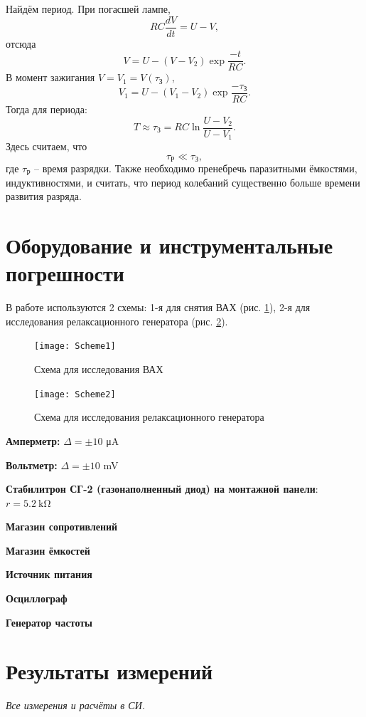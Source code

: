 \documentclass[a4paper]{article}
\newcommand{\picref}[1]{рис. \ref{#1}}
\newcommand{\Equip}[3]{
	
	{\bf #1:} $\Delta = \pm #2$ \si{#3}}
\newcommand{\equip}[1]{
	
	{\bf #1}}
\begin{document}
Найдём период. При погасшей лампе,
\begin{equation*}\label{key}
	R C \frac{d V}{d t} = U - V,
\end{equation*}
отсюда
\begin{equation*}\label{key}
	V = U - (V - V_2)\exp \frac{-t}{R C}.
\end{equation*}
В момент зажигания $ V = V_1 = V(\tau_З) $,
\begin{equation*}\label{key}
	V_1 = U - (V_1 - V_2)\exp \frac{-\tau_З}{R C}.
\end{equation*}
Тогда для периода:
\begin{equation}\label{y}
	T \approx \tau_З = R C \ln \frac{U-V_2}{U-V_1}.
\end{equation}
Здесь считаем, что 
\begin{equation}\label{усл}
	 \tau_Р \ll \tau_З,
\end{equation}
где $ \tau_Р $ -- время разрядки. Также необходимо пренебречь паразитными ёмкостями, индуктивностями, и считать, что период колебаний существенно больше времени развития разряда.


\section{Оборудование и инструментальные погрешности}

В работе используются 2 схемы: 1-я для снятия ВАХ (\picref{fig:s1}), 2-я для исследования релаксационного генератора (\picref{fig:s2}).

\begin{figure}[tbp]
	\centering
	\texttt{[image: Scheme1]}
	\caption{Схема для исследования ВАХ}
	\label{fig:s1}
\end{figure}

\begin{figure}[tbp]
	\centering
	\texttt{[image: Scheme2]}
	\caption{Схема для исследования релаксационного генератора}
	\label{fig:s2}
\end{figure}

\Equip{Амперметр}{10}{\micro \ampere}
\Equip{Вольтметр}{10}{\milli \volt}
\equip{Стабилитрон СГ-2 (газонаполненный диод) на монтажной панели}: $ r = \SI{5.2}{\kilo \ohm} $
\equip{Магазин сопротивлений}
\equip{Магазин ёмкостей}
\equip{Источник питания}
\equip{Осциллограф}
\equip{Генератор частоты}

\section{Результаты измерений}
\emph{Все измерения и расчёты в СИ.}
\end{document}

